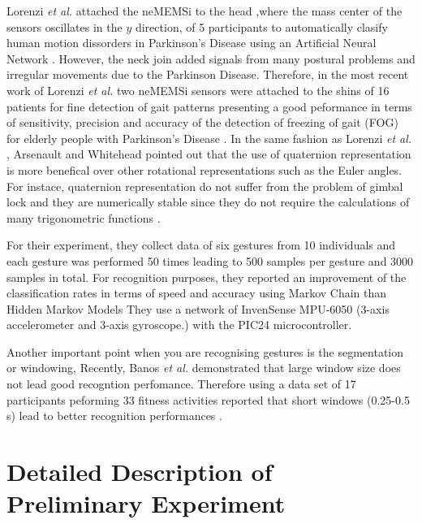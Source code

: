 \documentclass[10pt,journal,onecolumn,compsoc]{IEEEtran}
\begin{document}
Lorenzi \textit{et al.} attached the  neMEMSi to the head 
,where the mass center of the sensors oscillates in the $y$ direction,
of 5 participants to automatically clasify human motion dissorders in Parkinson's Disease
using an Artificial Neural Network \cite{Lorenzi2015}.
However, the neck join added signals from many postural problems
and irregular movements due to the Parkinson Disease.
Therefore, in the most recent work of Lorenzi \textit{et al.} two neMEMSi sensors were attached to the shins
of 16 patients for fine detection of gait patterns
presenting a good peformance in terms of sensitivity, precision and accuracy of 
the detection of freezing of gait (FOG) for elderly people with Parkinson's Disease  \cite{Lorenzi2016}.
In the same fashion as Lorenzi \textit{et al.} \cite{Lorenzi2016}, Arsenault and Whitehead 
pointed out that the use of quaternion representation is more benefical over 
other rotational representations such as the Euler angles.
For instace, quaternion representation do not suffer from the problem of gimbal lock
and they are numerically stable 
since they do not require the calculations of many trigonometric functions \cite{Lorenzi2015, Arsenault2015_a, Munkundan2002}.

For their experiment, they collect data 
of six gestures from 10 individuals and each gesture was 
performed 50 times leading to 500 samples per gesture and 3000 samples in total.
For recognition purposes, they reported an improvement of the classification rates
in terms of speed and accuracy using Markov Chain than Hidden Markov Models \cite{Arsenault2015_a, Arsenault2015_b}
They use a network of 
InvenSense MPU-6050 (3-axis accelerometer and 3-axis gyroscope.)
with the  PIC24 microcontroller.
  
Another important point when you are recognising gestures is the segmentation or windowing,
Recently, Banos \textit{et al.} 
demonstrated that large window size does not lead good recogntion perfomance.
Therefore using a data set of 17 participants peforming 33 fitness activities 
reported that short windows (0.25-0.5 s) lead to better recognition performances \cite{Banos2014}. 




\section{Detailed Description of Preliminary Experiment}
\end{document}
